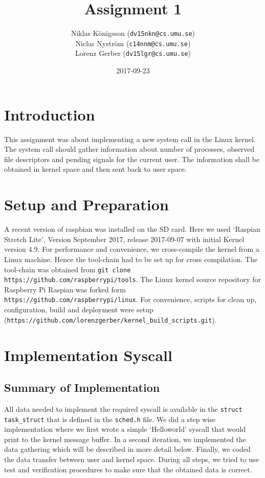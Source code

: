 \documentclass[a4paper,11pt,twoside]{article}
\title{Assignment 1}
\author{Niklas Königsson ({\tt{dv15nkn@cs.umu.se}}) \\
Niclas Nyström ({\tt{c14nnm@cs.umu.se}}) \\
Lorenz Gerber ({\tt{dv15lgr@cs.umu.se}})
}
\date{2017-09-23}
\begin{document}
\lstset{language=C}
\maketitle
\thispagestyle{empty}
\newpage

\clearpage
{}

\section{Introduction}
This assignment was about implementing a new system call in the Linux kernel.
The system call should gather information about number of processes, observed
file descriptors and pending signals for the current user. The information shall
be obtained in kernel space and then sent back to user space.

\section{Setup and Preparation}
A recent version of raspbian was installed on the SD card. Here we used `Raspian
Stretch Lite', Version September 2017, release 2017-09-07 with initial Kernel
version 4.9. For performance and convenience, we cross-compile the kernel from a
Linux machine. Hence the tool-chain had to be set up for cross compilation. The
tool-chain was obtained from \verb+git clone https://github.com/raspberrypi/tools+.
The Linux kernel source repository for Raspberry Pi Raspian was forked form
\verb+https://github.com/raspberrypi/linux+. For convenience, scripts for clean
up, configuration, build and deployment were setup
(\verb+https://github.com/lorenzgerber/kernel_build_scripts.git+).

\section{Implementation Syscall}
\subsection{Summary of Implementation}
All data needed to implement the required syscall is available in the
\verb+struct task_struct+ that is defined in the \verb+sched.h+ file. We did a
step wise implementation where we first wrote a simple `Helloworld' syscall that
would print to the kernel message buffer. In a second iteration, we implemented
the data gathering which will be described in more detail below. Finally, we
coded the data transfer between user and kernel space. During all steps, we
tried to use test and verification procedures to make sure that the obtained
data is correct.
\end{document}
